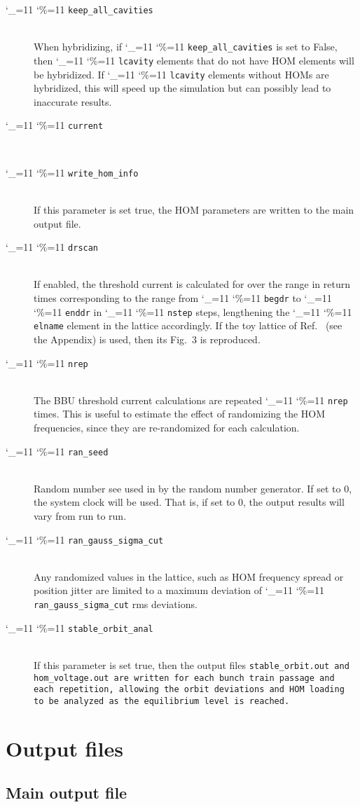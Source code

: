 \documentclass[11pt]{article}
\newcommand\ttcmd{\begingroup\catcode`\_=11 \catcode`\%=11 \dottcmd}
\newcommand\dottcmd[1]{\texttt{#1}\endgroup}
\newcommand{\vn}{\ttcmd}
\newcommand{\Newline}{\hfil \\}
\begin{document}
{\begin{description}
  \item[\vn{keep_all_cavities}] \Newline
When hybridizing, if \vn{keep_all_cavities} is set to False, then
\vn{lcavity} elements that do not have HOM elements will be
hybridized. If \vn{lcavity} elements without HOMs are hybridized, this
will speed up the simulation but can possibly lead to inaccurate
results.
  \item[\vn{current}] \Newline
  \item[\vn{write_hom_info}] \Newline
If this parameter is set true, the HOM parameters are written to the
main output file.
  \item[\vn{drscan}] \Newline
If enabled, the threshold current is calculated for over the range in return times
corresponding to the range from \vn{begdr} to \vn{enddr} in  \vn{nstep} steps,
lengthening the \vn{elname} element in the lattice accordingly. If the toy lattice
of Ref.~\cite{ref:Hoffstaetter04} (see the Appendix) is used, then its Fig.~3 is reproduced.
  \item[\vn{nrep}] \Newline
The BBU threshold current calculations are repeated \vn{nrep} times. This is useful
to estimate the effect of randomizing the HOM frequencies, since they are re-randomized for
each calculation.
  \item[\vn{ran_seed}] \Newline
Random number see used in by the random number generator. If set to 0, the system clock
will be used. That is, if set to 0, the output results will vary from run to run. 
  \item[\vn{ran_gauss_sigma_cut}] \Newline
Any randomized values in the lattice, such as HOM frequency spread or position jitter
are limited to a maximum deviation of \vn{ran_gauss_sigma_cut} rms deviations. 
  \item[\vn{stable_orbit_anal}] \Newline
If this parameter is set true, then the output files \tt{stable_orbit.out} and \tt{hom_voltage.out}
are written for each bunch train passage and each repetition, allowing the orbit deviations
and HOM loading to be analyzed as the equilibrium level is reached.

\end{description}
\section{Output files} 

\subsection{Main output file}
}
\end{document}
